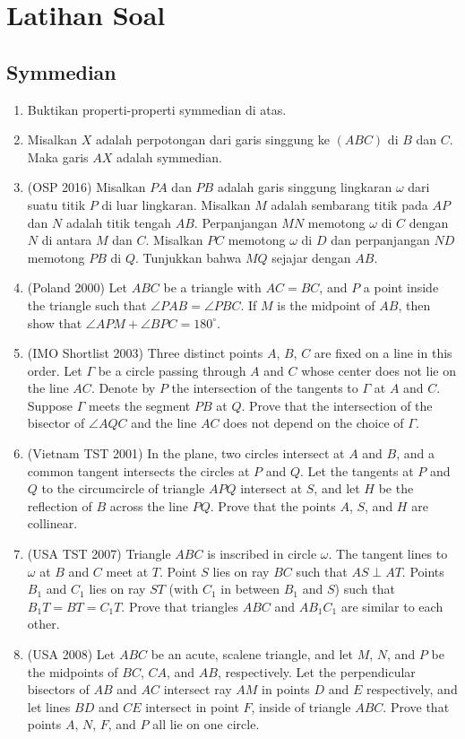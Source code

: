 \documentclass[11pt]{scrartcl}
\begin{document}
\section{Latihan Soal}
\subsection{Symmedian}
\begin{enumerate}
    \item Buktikan properti-properti symmedian di atas.
    \item Misalkan $X$ adalah perpotongan dari garis singgung ke $ (ABC) $ di $ B $ dan $ C $. Maka garis $ AX $ adalah symmedian.
    \item (OSP 2016) Misalkan $PA$ dan $PB$ adalah garis singgung lingkaran $\omega$ dari suatu titik $P$ di luar lingkaran. Misalkan $M$ adalah sembarang titik pada $AP$ dan $N$ adalah titik tengah $AB$. Perpanjangan $MN$ memotong $\omega$ di $C$ dengan $N$ di antara $M$ dan $C$. Misalkan $PC$ memotong $\omega$ di $D$ dan perpanjangan $ND$ memotong $PB$ di $Q$. Tunjukkan bahwa $MQ$ sejajar dengan $AB$.
    \item (Poland 2000) Let $ABC$ be a triangle with $AC = BC$, and $P$ a point inside the triangle such that $\angle PAB = \angle PBC$. If $M$ is the midpoint of $AB$, then show that $\angle APM + \angle BPC = 180^{\circ}$.

    \item (IMO Shortlist 2003) Three distinct points $A$, $B$, $C$ are fixed on a line in this order. Let $\Gamma$ be a circle passing through $A$ and $C$ whose center does not lie on the line $AC$. Denote by $P$ the intersection of the tangents to $\Gamma$ at $A$ and $C$. Suppose $\Gamma$ meets the segment $PB$ at $Q$. Prove that the intersection of the bisector of $\angle AQC$ and the line $AC$ does not depend on the choice of $\Gamma$.
    
    \item (Vietnam TST 2001) In the plane, two circles intersect at $A$ and $B$, and a common tangent intersects the circles at $P$ and $Q$. Let the tangents at $P$ and $Q$ to the circumcircle of triangle $APQ$ intersect at $S$, and let $H$ be the reflection of $B$ across the line $PQ$. Prove that the points $A$, $S$, and $H$ are collinear.
    
    \item (USA TST 2007) Triangle $ABC$ is inscribed in circle $\omega$. The tangent lines to $\omega$ at $B$ and $C$ meet at $T$. Point $S$ lies on ray $BC$ such that $AS \perp AT$. Points $B_1$ and $C_1$ lies on ray $ST$ (with $C_1$ in between $B_1$ and $S$) such that $B_1T = BT = C_1T$. Prove that triangles $ABC$ and $AB_1C_1$ are similar to each other.
    
    \item (USA 2008) Let $ABC$ be an acute, scalene triangle, and let $M$, $N$, and $P$ be the midpoints of $BC$, $CA$, and $AB$, respectively. Let the perpendicular bisectors of $AB$ and $AC$ intersect ray $AM$ in points $D$ and $E$ respectively, and let lines $BD$ and $CE$ intersect in point $F$, inside of triangle $ABC$. Prove that points $A$, $N$, $F$, and $P$ all lie on one circle.
\end{enumerate}
\end{document}
